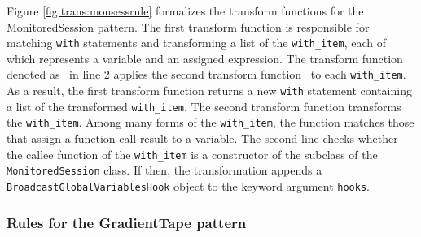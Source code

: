 
Figure \ref{fig:trans:monsessrule} formalizes the transform functions for the
MonitoredSession pattern.
The first transform function is responsible for matching {\tt with} statements
and transforming a list of the {\tt with\_item}, each of which represents a
variable and an assigned expression. 
The transform function denoted as \fkwwithitem~in line 2 applies the second
transform function \fkwithitem~to each {\tt with\_item}.
As a result, the first transform function returns a new {\tt with} statement
containing a list of the transformed {\tt with\_item}.
The second transform function transforms the {\tt with\_item}.
Among many forms of the {\tt with\_item}, the function matches those that
assign a function call result to a variable.
The second line checks whether the callee function of the {\tt with\_item} is a
constructor of the subclass of the {\tt MonitoredSession} class. 
If then, the transformation appends a {\tt BroadcastGlobalVariablesHook} object
to the keyword argument {\tt hooks}.\\

\subsubsection{Rules for the GradientTape pattern}\label{sec:grad}


